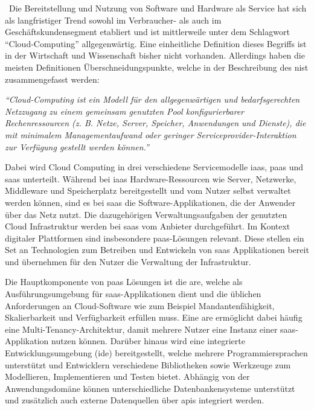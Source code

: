 \
Die Bereitstellung und Nutzung von Software und Hardware als Service hat sich als langfristiger Trend sowohl im Verbraucher- als auch im Geschäftskundensegment etabliert und ist mittlerweile unter dem Schlagwort \enquote{Cloud-Computing} allgegenwärtig. Eine einheitliche Definition dieses Begriffs ist in der Wirtschaft und Wissenschaft bisher nicht vorhanden. Allerdings haben die meisten Definitionen Überschneidungspunkte, welche in der Beschreibung des \ac{nist} zusammengefasst werden: 

\begin{center}
    \textit{\enquote{Cloud-Computing ist ein Modell für den allgegenwärtigen und bedarfsgerechten Netzzugang zu einem gemeinsam genutzten Pool konfigurierbarer Rechenressourcen (z. B. Netze, Server, Speicher, Anwendungen und Dienste), die mit minimalem Managementaufwand oder geringer Serviceprovider-Interaktion zur Verfügung gestellt werden können.}} \autocite[S. 2]{MELL2011}
\end{center}

Dabei wird Cloud Computing in drei verschiedene Servicemodelle \ac{iaas}, \ac{paas} und \ac{saas} unterteilt. Während bei \ac{iaas} Hardware-Ressourcen wie Server, Netzwerke, Middleware und Speicherplatz bereitgestellt und vom Nutzer selbst verwaltet werden können, sind es bei \ac{saas} die Software-Applikationen, die der Anwender über das Netz nutzt. Die dazugehörigen Verwaltungsaufgaben der genutzten Cloud Infrastruktur werden bei \ac{saas} vom Anbieter durchgeführt. Im Kontext digitaler Plattformen sind insbesondere \ac{paas}-Lösungen relevant.\autocite[Vgl.][S. 2f]{MELL2011} Diese stellen ein Set an Technologien zum Betreiben und Entwickeln von \ac{saas} Applikationen bereit und übernehmen für den Nutzer die Verwaltung der Infrastruktur.\autocite[Vgl.][S. 8]{BRAUNINGER2012}

Die Hauptkomponente von \ac{paas} Lösungen ist die \ac{are}, welche als Ausführungsumgebung für \ac{saas}-Applikationen dient und die üblichen Anforderungen an Cloud-Software wie zum Beispiel Mandantenfähigkeit, Skalierbarkeit und Verfügbarkeit erfüllen muss. Eine \ac{are} ermöglicht dabei häufig eine Multi-Tenancy-Architektur, damit mehrere Nutzer eine Instanz einer \ac{saas}-Applikation nutzen können. Darüber hinaus wird eine integrierte Entwicklungsumgebung (\acs{ide}) bereitgestellt, welche mehrere Programmiersprachen unterstützt und Entwicklern verschiedene Bibliotheken sowie Werkzeuge zum Modellieren, Implementieren und Testen bietet. Abhängig von der Anwendungsdomäne können unterschiedliche Datenbankensysteme unterstützt und zusätzlich auch externe Datenquellen über \acp{api} integriert werden. \autocite[Vgl.][S. 371]{BEIMBORN2011}

